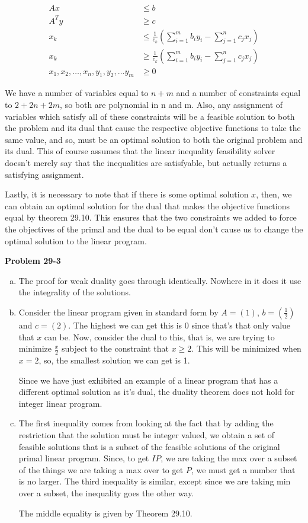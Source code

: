 \documentclass{article}
\begin{document}
\begin{enumerate}[a.]
\begin{align*}
Ax&\le b\\
A^T y &\ge c\\
x_k &\le \frac{1}{c_k} \left(\sum_{i=1}^m b_i y_i - \sum_{j=1}^n c_j x_j\right)\\
x_k &\ge \frac{1}{c_k} \left(\sum_{i=1}^m b_i y_i - \sum_{j=1}^n c_j x_j\right)\\
x_1,x_2,\ldots,x_n,y_1,y_2,\ldots y_m &\ge 0
\end{align*}

We have a number of variables equal to $n+m$ and a number of constraints equal to $2 + 2n +2m$, so both are polynomial in n and m. Also, any assignment of variables which satisfy all of these constraints will be a feasible solution to both the problem and its dual that cause the respective objective functions to take the same value, and so, must be an optimal solution to both the original problem and its dual. This of course assumes that the linear inequality feasibility solver doesn't merely say that the inequalities are satisfyable, but actually returns a satisfying assignment.

Lastly, it is necessary to note that if there is some optimal solution $x$, then, we can obtain an optimal solution for the dual that makes the objective functions equal by theorem 29.10. This ensures that the two constraints we added to force the objectives of the primal and the dual to be equal don't cause us to change the optimal solution to the linear program.
\end{enumerate}


\noindent\textbf{Problem 29-3}\\
\begin{enumerate}[a.]
\item The proof for weak duality goes through identically. Nowhere in it does it use the integrality of the solutions.
\item Consider the linear program given in standard form by $A = \left(1\right)$, $b = \left(\frac{1}{2}\right)$ and $c = \left( 2 \right)$. The highest we can get this is $0$ since that's that only value that $x$ can be. Now, consider the dual to this, that is, we are trying to minimize $\frac{x}{2}$ subject to the constraint that $x \ge 2$. This will be minimized when $x=2$, so, the smallest solution we can get is 1.

Since we have just exhibited an example of a linear program that has a different optimal solution as it's dual, the duality theorem does not hold for integer linear program.
\item
The first inequality comes from looking at the fact that by adding the restriction that the solution must be integer valued, we obtain a set of feasible solutions that is a subset of the feasible solutions of the original primal linear program. Since, to get $IP$, we are taking the max over a subset of the things we are taking a max over to get $P$, we must get a number that is no larger. The third inequality is similar, except since we are taking min over a subset, the inequality goes the other way.

The middle equality is given by Theorem 29.10.
\end{enumerate}
\end{document}
